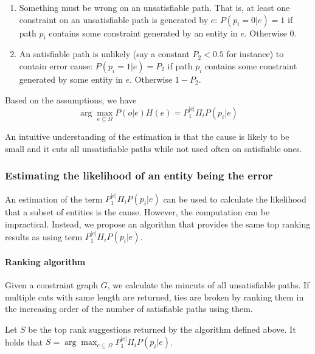 \begin{enumerate}
\item Something must be wrong on an unsatisfiable path. That is, at least
one constraint on an unsatisfiable path is generated by $e$:
$P(p_i=0|e) = 1$ if path $p_i$ contains some constraint generated by
an entity in $e$.  Otherwise 0.

\item An satisfiable path is unlikely (say a constant $P_2<0.5$ for instance)
to contain error cause: $P(p_i=1|e) = P_2$ if path $p_i$ contains some
constraint generated by some entity in $e$.  Otherwise $1-P_2$.  
\end{enumerate}

Based on the assumptions, we have
\[\arg\max_{e \subseteq \Omega} P(o|e) H(e) = P_1^{|e|} \Pi_i P(p_i|e) \]

An intuitive understanding of the estimation is that the cause is likely to be
small and it cuts all unsatisfiable paths while not used often on satisfiable ones.

\subsubsection{Estimating the likelihood of an entity being the error}
\label{sec:rankingalg}

An estimation of the term $P_1^{|e|} \Pi_i P(p_i|e)$ can be used to
calculate the likelihood that a subset of entities is the cause.
However, the computation can be impractical. Instead, we propose an
algorithm that provides the same top ranking results as using term
$P_1^{|e|} \Pi_i P(p_i|e)$.

\paragraph{Ranking algorithm}

Given a constraint graph $G$, we calculate the mincuts of all unsatisfiable
paths. If multiple cuts with same length are returned, ties are broken by
ranking them in the increasing order of the number of satisfiable paths using
them.

\begin{Theorem}
Let $S$ be the top rank suggestions returned by the algorithm defined above.
It holds that $S = \arg\max_{e\subseteq \Omega}P_1^{|e|} \Pi_i P(p_i|e)$.  
\end{Theorem}

